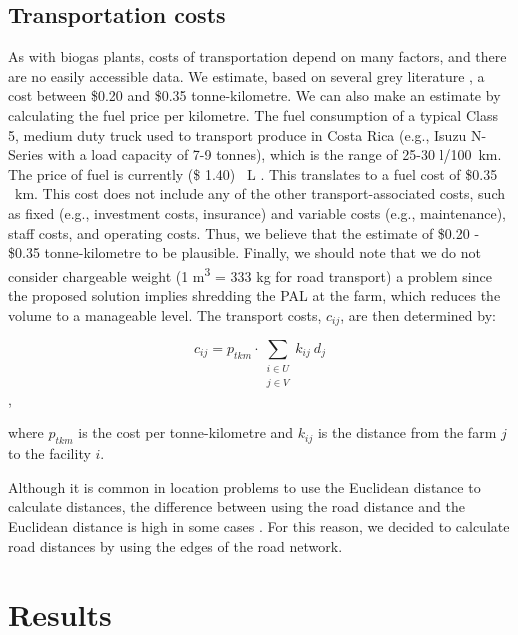 \subsection{Transportation costs}

As with biogas plants, costs of transportation depend on many factors, and there are no easily accessible data. We estimate, based on several grey literature \citep{van2020cost, transportCost1, transportCost2}, a cost between \$0.20 and \$0.35 tonne-kilometre. We can also make an estimate by calculating the fuel price per kilometre. The fuel consumption of a typical Class 5, medium duty truck used to transport produce in Costa Rica (e.g., Isuzu N-Series with a load capacity of 7-9 tonnes), which is the range of 25-30 \si{l/100~km}. The price of fuel is currently  (\$ 1.40) \si{\per \L} \citep{PreciosHistricosRECOPE}. This translates to a fuel cost of \$0.35 \si{\per \km}. This cost does not include any of the other transport-associated costs, such as fixed (e.g., investment costs, insurance) and variable costs (e.g., maintenance), staff costs, and operating costs. Thus, we believe that the estimate of \$0.20 - \$0.35 tonne-kilometre to be plausible. Finally, we should note that we do not consider chargeable weight (1 \si{\meter \cubed} = 333 \si{\kilogram} for road transport) a problem since the proposed solution implies shredding the PAL at the farm, which reduces the volume to a manageable level. The transport costs, $c_{ij}$, are then determined by: 

\begin{equation}
    c_{ij} = p_{tkm} \cdot \sum_{\substack{{i \in U} \\ j \in V}} k_{ij} \ d_j
\end{equation},

where $p_{tkm}$ is the cost per tonne-kilometre and $k_{ij}$ is the distance from the farm $j$ to the facility $i$.

Although it is common in location problems to use the Euclidean distance to calculate distances, the difference between using the road distance and the Euclidean distance is high in some cases \citep{pittayarugsarit2019comparison}. For this reason, we decided to calculate road distances by using the edges of the road network. 

\section{Results}

